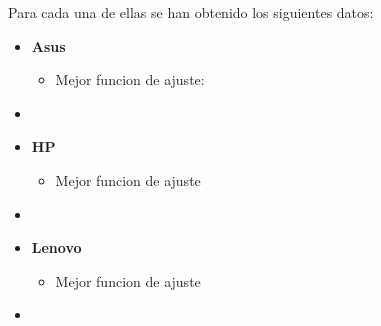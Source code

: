 \documentclass{homework}
\begin{document}
    Para cada una de ellas se han obtenido los siguientes datos:

    \begin{itemize}

        \item \textbf{Asus}
            \begin{itemize}
                \item Mejor funcion de ajuste: $ $
            \end{itemize}
        \item 

        \item \textbf{HP}
            \begin{itemize}
                \item Mejor funcion de ajuste
            \end{itemize}
        \item 

        \item \textbf{Lenovo}
            \begin{itemize}
                \item Mejor funcion de ajuste
            \end{itemize}
        \item 

        
    \end{itemize}

    
\end{document}
